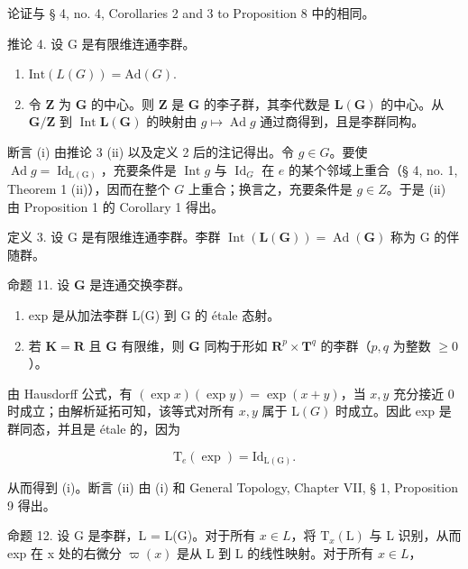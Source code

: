 论证与 § 4, no. 4, Corollaries 2 and 3 to Proposition 8 中的相同。

推论 4. 设 G 是有限维连通李群。

\begin{enumerate}
\def\labelenumi{(\roman{enumi})}
\item
  \(\text{Int}(L(G)) = \text{Ad}(G).\)
\item
  令 \(\mathbf{Z}\) 为 \(\mathbf{G}\) 的中心。则 \(\mathbf{Z}\) 是 \(\mathbf{G}\) 的李子群，其李代数是 \(\mathbf{L}(\mathbf{G})\) 的中心。从 \(\mathbf{G} / \mathbf{Z}\) 到 \(\operatorname{Int} \mathbf{L}(\mathbf{G})\) 的映射由 \(g \mapsto \operatorname{Ad} g\) 通过商得到，且是李群同构。
\end{enumerate}

断言 (i) 由推论 3 (ii) 以及定义 2 后的注记得出。令 \(g \in G\)。要使 \(\operatorname{Ad} g = \operatorname{Id}_{\operatorname{L(G)}}\)，充要条件是 \(\operatorname{Int} g\) 与 \(\operatorname{Id}_G\) 在 \(e\) 的某个邻域上重合（§ 4, no. 1, Theorem 1 (ii)），因而在整个 \(G\) 上重合；换言之，充要条件是 \(g \in Z\)。于是 (ii) 由 Proposition 1 的 Corollary 1 得出。

定义 3. 设 G 是有限维连通李群。李群 \(\operatorname{Int}(\mathbf{L}(\mathbf{G})) = \operatorname{Ad}(\mathbf{G})\) 称为 G 的伴随群。

命题 11. 设 \(\mathbf{G}\) 是连通交换李群。

\begin{enumerate}
\def\labelenumi{(\roman{enumi})}
\item
  exp 是从加法李群 L(G) 到 G 的 étale 态射。
\item
  若 \(\mathbf{K} = \mathbf{R}\) 且 \(\mathbf{G}\) 有限维，则 \(\mathbf{G}\) 同构于形如 \(\mathbf{R}^p \times \mathbf{T}^q\) 的李群（\(p, q\) 为整数 \(\geqslant 0\)）。
\end{enumerate}

由 Hausdorff 公式，有 \((\exp x)(\exp y) = \exp (x + y)\)，当 \(x,y\) 充分接近 0 时成立；由解析延拓可知，该等式对所有 \(x,y\) 属于 \(\mathrm{L}(G)\) 时成立。因此 exp 是群同态，并且是 étale 的，因为

\[
\mathrm{T} _ {e} (\exp) = \mathrm{Id} _ {\mathrm{L(G)}}.
\]

从而得到 (i)。断言 (ii) 由 (i) 和 General Topology, Chapter VII, § 1, Proposition 9 得出。

命题 12. 设 G 是李群，L = L(G)。对于所有 \(x \in L\)，将 \(\mathrm{T}_{x}(\mathrm{L})\) 与 L 识别，从而 exp 在 x 处的右微分 \(\varpi(x)\) 是从 L 到 L 的线性映射。对于所有 \(x \in L\)，

